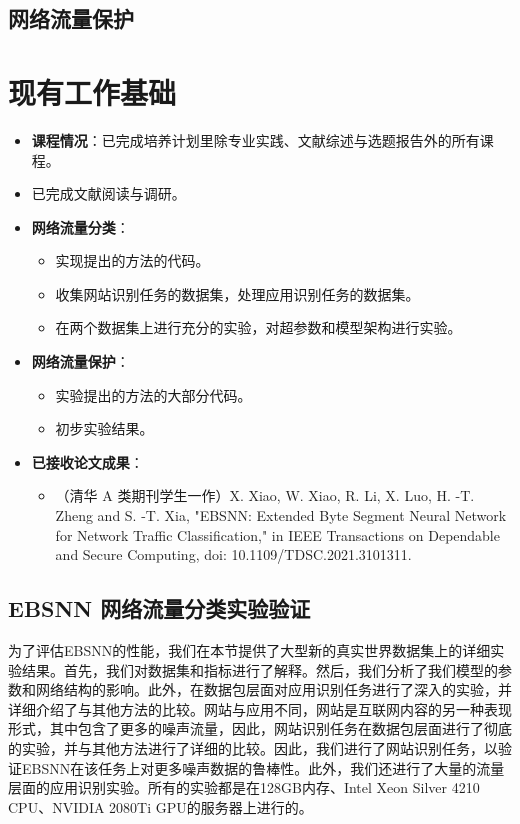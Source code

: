 \documentclass[degree=master,cjk-font=noto]{thuthesis}
\begin{document}
\section{网络流量保护}

\chapter{现有工作基础}

\begin{itemize}
	\item \textbf{课程情况}：已完成培养计划里除专业实践、文献综述与选题报告外的所有课程。
	\item 已完成文献阅读与调研。
	\item \textbf{网络流量分类}：
	\begin{itemize}
		\item 实现提出的方法的代码。
		\item 收集网站识别任务的数据集，处理应用识别任务的数据集。
		\item 在两个数据集上进行充分的实验，对超参数和模型架构进行实验。
	\end{itemize}
	\item \textbf{网络流量保护}：
	\begin{itemize}
		\item 实验提出的方法的大部分代码。
		\item 初步实验结果。
	\end{itemize}
	\item \textbf{已接收论文成果}：
	\begin{itemize}
		\item （清华 A 类期刊学生一作）X. Xiao, W. Xiao, R. Li, X. Luo, H. -T. Zheng and S. -T. Xia, "EBSNN: Extended Byte Segment Neural Network for Network Traffic Classification," in IEEE Transactions on Dependable and Secure Computing, doi: 10.1109/TDSC.2021.3101311.
	\end{itemize}
\end{itemize}

\section{EBSNN 网络流量分类实验验证}

为了评估EBSNN的性能，我们在本节提供了大型新的真实世界数据集上的详细实验结果。首先，我们对数据集和指标进行了解释。然后，我们分析了我们模型的参数和网络结构的影响。此外，在数据包层面对应用识别任务进行了深入的实验，并详细介绍了与其他方法的比较。网站与应用不同，网站是互联网内容的另一种表现形式，其中包含了更多的噪声流量，因此，网站识别任务在数据包层面进行了彻底的实验，并与其他方法进行了详细的比较。因此，我们进行了网站识别任务，以验证EBSNN在该任务上对更多噪声数据的鲁棒性。此外，我们还进行了大量的流量层面的应用识别实验。所有的实验都是在128GB内存、Intel Xeon Silver 4210 CPU、NVIDIA 2080Ti GPU的服务器上进行的。
\end{document}
